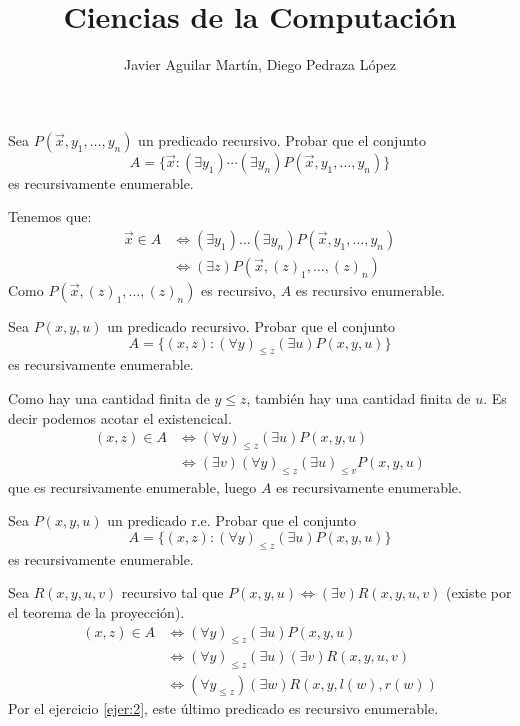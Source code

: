 \documentclass[twoside]{article}
\newcommand{\sii}{{\Leftrightarrow}}
\begin{document}
\title{Ciencias de la Computación}

\author{Javier Aguilar Martín, Diego Pedraza López}
\maketitle

\begin{ejercicio}{1}
Sea $P(\vec{x},y_1,\dots,y_n)$ un predicado recursivo. Probar que el conjunto
\[ A = \{\vec{x} : (\exists y_1)\cdots(\exists y_n) P(\vec{x},y_1,\dots,y_n)\} \]
es recursivamente enumerable.
\end{ejercicio}
\begin{solucion}
Tenemos que:
\begin{align*}
	\vec{x} \in A & \sii (\exists y_1)\dots(\exists y_n) P(\vec{x},y_1,\dots,y_n)\\
	& \sii (\exists z) P(\vec{x},(z)_1,\dots,(z)_n)
\end{align*}
Como $P(\vec{x},(z)_1,\dots,(z)_n)$ es recursivo, $A$ es recursivo enumerable.
\end{solucion}

\newpage

\begin{ejercicio}{2}
Sea $P(x,y,u)$ un predicado recursivo. Probar que el conjunto
\[ A = \{(x,z) : (\forall y)_{≤z} (\exists u) P(x,y,u)\} \]
es recursivamente enumerable.
\end{ejercicio}
\begin{solucion}
Como hay una cantidad finita de $y≤z$, también hay una cantidad finita de $u$. Es decir podemos acotar el existencical.
\begin{align*}
	(x,z) \in A & \sii (\forall y)_{≤z} (\exists u) P(x,y,u)\\
	& \sii (\exists v)(\forall y)_{≤z} (\exists u)_{≤v} P(x,y,u)
\end{align*}
 que es recursivamente enumerable, luego $A$ es recursivamente enumerable.
\end{solucion}

\newpage

\begin{ejercicio}{3}
Sea $P(x,y,u)$ un predicado r.e. Probar que el conjunto
\[ A = \{(x,z) : (\forall y)_{≤z} (\exists u) P(x,y,u)\} \]
es recursivamente enumerable.
\end{ejercicio}
\begin{solucion}
Sea $R(x,y,u,v)$ recursivo tal que $P(x,y,u) \sii (\exists v) R(x,y,u,v)$ (existe por el teorema de la proyección).
\begin{align*}
	(x,z) \in A & \sii (\forall y)_{≤z} (\exists u) P(x,y,u)\\
	& \sii (\forall y)_{≤z} (\exists u) (\exists v) R(x,y,u,v)\\
	& \sii (\forall y_{≤z}) (\exists w) R(x,y,l(w),r(w))
\end{align*}
Por el ejercicio \ref{ejer:2}, este último predicado es recursivo enumerable. 
\end{solucion}
\end{document}

